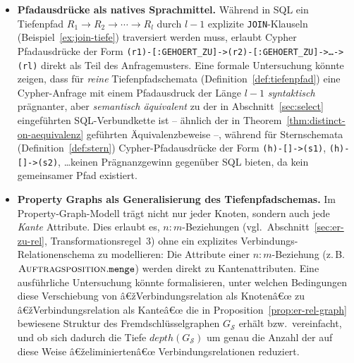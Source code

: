 ﻿\documentclass[a4paper,12pt]{report}
\theoremstyle{definition}
\theoremstyle{remark}
\newcommand{\depth}{\mathit{depth}}
\begin{document}
\begin{itemize}
  \item \textbf{Pfadausdrücke als natives Sprachmittel.} Während in
    SQL ein Tiefenpfad $R_1\to R_2\to\cdots\to R_l$ durch $l-1$
    explizite \texttt{JOIN}-Klauseln (Beispiel~\ref{ex:join-tiefe})
    traversiert werden muss, erlaubt Cypher Pfadausdrücke der Form
    \texttt{(r1)-[:GEHOERT\_ZU]->(r2)-[:GEHOERT\_ZU]->\ldots->(rl)}
    direkt als Teil des Anfragemusters. Eine formale Untersuchung
    könnte zeigen, dass für \emph{reine} Tiefenpfadschemata
    (Definition~\ref{def:tiefenpfad}) eine Cypher-Anfrage mit einem
    Pfadausdruck der Länge $l-1$ \emph{syntaktisch} prägnanter, aber
    \emph{semantisch äquivalent} zu der in
    Abschnitt~\ref{sec:select} eingeführten SQL-Verbundkette ist --
    ähnlich der in Theorem~\ref{thm:distinct-on-aequivalenz}
    geführten Äquivalenzbeweise --, während für Sternschemata
    (Definition~\ref{def:stern}) Cypher-Pfadausdrücke der Form
    \texttt{(h)-[]->(s1)}, \texttt{(h)-[]->(s2)}, \ldots keinen
    Prägnanzgewinn gegenüber SQL bieten, da kein gemeinsamer Pfad
    existiert.

  \item \textbf{Property Graphs als Generalisierung des
    Tiefenpfadschemas.} Im Property-Graph-Modell trägt nicht nur
    jeder Knoten, sondern auch jede \emph{Kante} Attribute. Dies
    erlaubt es, $n{:}m$-Beziehungen (vgl.\
    Abschnitt~\ref{sec:er-zu-rel}, Transformationsregel~3) ohne ein
    explizites Verbindungs-Relationenschema zu modellieren: Die
    Attribute einer $n{:}m$-Beziehung (z.\,B.\
    $\textsc{Auftragsposition}.\texttt{menge}$) werden direkt zu
    Kantenattributen. Eine ausführliche Untersuchung könnte
    formalisieren, unter welchen Bedingungen diese Verschiebung von
    â€žVerbindungsrelation als Knotenâ€œ zu â€žVerbindungsrelation als
    Kanteâ€œ die in Proposition~\ref{prop:er-rel-graph} bewiesene
    Struktur des Fremdschlüsselgraphen $G_{\mathcal{S}}$ erhält bzw.\
    vereinfacht, und ob sich dadurch die Tiefe
    $\depth(G_{\mathcal{S}})$ um genau die Anzahl der auf diese Weise
    â€želiminiertenâ€œ Verbindungsrelationen reduziert.


\end{itemize}
\end{document}
